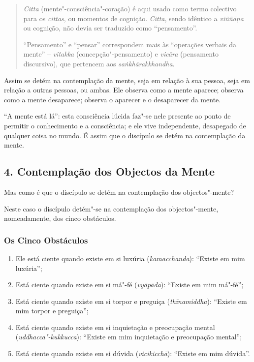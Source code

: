 
\begin{quote}
  \emph{Citta} (mente"-consciência"-coração) é aqui usado como termo colectivo
  para os \emph{cittas}, ou momentos de cognição. \emph{Citta}, sendo idêntico a
  \emph{viññā\d{n}a} ou cognição, não devia ser traduzido como “pensamento”.

  “Pensamento” e “pensar” correspondem mais às “operações verbais da
  mente” -- \emph{vitakka} (concepção"-pensamento) e \emph{vicāra} (pensamento
  discursivo), que pertencem aos \emph{sa\.{n}khārakkhandha}.
\end{quote}

Assim se detém na contemplação da mente, seja em relação à sua pessoa, seja em
relação a outras pessoas, ou ambas. Ele observa como a mente aparece; observa
como a mente desaparece; observa o aparecer e o desaparecer da mente.

“A mente está lá”: esta consciência lúcida faz"-se nele presente ao ponto de
permitir o conhecimento e a consciência; e ele vive independente, desapegado de
qualquer coisa no mundo. É assim que o discípulo se detém na contemplação da
mente.

\subsection{4. Contemplação dos Objectos da Mente}


Mas como é que o discípulo se detém na contemplação dos objectos"-mente?

Neste caso o discípulo detém"-se na contemplação dos objectos"-mente,
nomeadamente, dos cinco obstáculos.

\subsubsection{Os Cinco Obstáculos}


\begin{enumerate}
  \item Ele está ciente quando existe em si luxúria (\emph{kāmacchanda}):
        “Existe em mim luxúria”;

  \item Está ciente quando existe em si má"-fé (\emph{vyāpāda}): “Existe em mim
        má"-fé”;

  \item Está ciente quando existe em si torpor e preguiça (\emph{thīnamiddha}):
        “Existe em mim torpor e preguiça”;

  \item Está ciente quando existe em si inquietação e preocupação mental
        (\emph{uddhacca"-kukkucca}): “Existe em mim inquietação e preocupação
        mental”;

  \item Está ciente quando existe em si dúvida (\emph{vicikicchā}): “Existe em
        mim dúvida”.
\end{enumerate}


